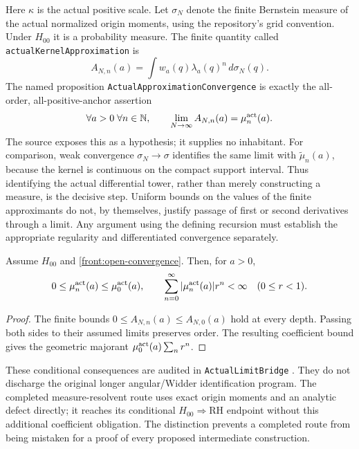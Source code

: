 Here $\kappa$ is the actual positive scale. Let $\sigma_N$ denote the finite Bernstein measure of the actual
normalized origin moments, using the repository's grid convention.
Under $H_{00}$ it is a probability measure. The finite quantity called
\texttt{actualKernelApproximation} is
\begin{equation}
 A_{N,n}(a)=\int w_a(q)\lambda_a(q)^n\,d\sigma_N(q).
\end{equation}
The named proposition \texttt{ActualApproximationConvergence} is exactly
the all-order, all-positive-anchor assertion
\begin{equation}\label{front:open-convergence}
 \forall a>0\;\forall n\in\mathbb N,\qquad
 \lim_{N\to\infty}A_{N,n}(a)=\mu_n^{\rm act}(a).
\end{equation}
The source exposes this as a hypothesis; it supplies no inhabitant.
For comparison, weak convergence $\sigma_N\to\sigma$ identifies the
same limit with $\widetilde\mu_n(a)$, because the kernel is continuous
on the compact support interval. Thus identifying the actual differential
tower, rather than merely constructing a measure, is the decisive step.
Uniform bounds on the values of the finite approximants do not, by
themselves, justify passage of first or second derivatives through a
limit. Any argument using the defining recursion must establish the
appropriate regularity and differentiated convergence separately.

\begin{proposition}\label{front:conditional-actual-bound}
Assume $H_{00}$ and \eqref{front:open-convergence}. Then, for $a>0$,
\begin{equation}
 0\leq\mu_n^{\rm act}(a)\leq\mu_0^{\rm act}(a),\qquad
 \sum_{n=0}^{\infty}|\mu_n^{\rm act}(a)|r^n<\infty
 \quad(0\leq r<1).
\end{equation}
\end{proposition}
\begin{proof}
The finite bounds $0\leq A_{N,n}(a)\leq A_{N,0}(a)$ hold at every
depth. Passing both sides to their assumed limits preserves order.
The resulting coefficient bound gives the geometric majorant
$\mu_0^{\rm act}(a)\sum_n r^n$.
\end{proof}

These conditional consequences are audited in \texttt{ActualLimitBridge}
\cite{source}. They do not discharge the original longer angular/Widder
identification program. The completed measure-resolvent route uses exact
origin moments and an analytic defect directly; it reaches its conditional
$H_{00}\!\Rightarrow\!\mathrm{RH}$ endpoint without this additional
coefficient obligation. The distinction prevents a completed route from
being mistaken for a proof of every proposed intermediate construction.

